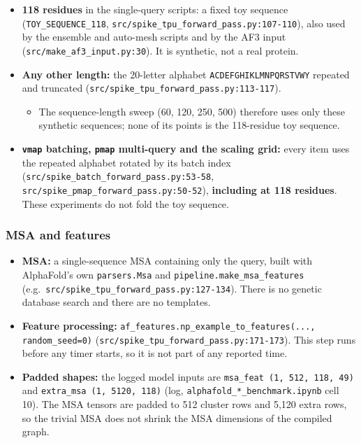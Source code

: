 \begin{itemize}
  \item \textbf{118 residues} in the single-query scripts: a fixed toy sequence
    (\texttt{TOY\_SEQUENCE\_118}, \texttt{src/\allowbreak{}spike\_\allowbreak{}tpu\_\allowbreak{}forward\_\allowbreak{}pass.py:107-110}), also used by the
    ensemble and auto-mesh scripts and by the AF3 input (\texttt{src/\allowbreak{}make\_\allowbreak{}af3\_\allowbreak{}input.py:30}).
    It is synthetic, not a real protein.
  \item \textbf{Any other length:} the 20-letter alphabet \texttt{ACDEFGHIKLMNPQRSTVWY} repeated
    and truncated (\texttt{src/\allowbreak{}spike\_\allowbreak{}tpu\_\allowbreak{}forward\_\allowbreak{}pass.py:113-117}).
    \begin{itemize}
      \item The sequence-length sweep (60, 120, 250, 500) therefore uses only these
        synthetic sequences; none of its points is the 118-residue toy sequence.
    \end{itemize}
  \item \textbf{\texttt{vmap} batching, \texttt{pmap} multi-query and the scaling grid:} every item uses
    the repeated alphabet rotated by its batch index
    (\texttt{src/\allowbreak{}spike\_\allowbreak{}batch\_\allowbreak{}forward\_\allowbreak{}pass.py:53-58}, \texttt{src/\allowbreak{}spike\_\allowbreak{}pmap\_\allowbreak{}forward\_\allowbreak{}pass.py:50-52}),
    \textbf{including at 118 residues}. These experiments do not fold the toy sequence.
\end{itemize}

\subsubsection{MSA and features}
\label{sec:meth-msa}

\begin{itemize}
  \item \textbf{MSA:} a single-sequence MSA containing only the query, built with
    AlphaFold's own \texttt{parsers.Msa} and \texttt{pipeline.make\_\allowbreak{}msa\_\allowbreak{}features} (e.g.\
    \texttt{src/\allowbreak{}spike\_\allowbreak{}tpu\_\allowbreak{}forward\_\allowbreak{}pass.py:127-134}). There is no genetic database search
    and there are no templates.
  \item \textbf{Feature processing:} \texttt{af\_\allowbreak{}features.np\_\allowbreak{}example\_\allowbreak{}to\_\allowbreak{}features(..., random\_\allowbreak{}seed=0)}
    (\texttt{src/\allowbreak{}spike\_\allowbreak{}tpu\_\allowbreak{}forward\_\allowbreak{}pass.py:171-173}). This step runs before any timer
    starts, so it is not part of any reported time.
  \item \textbf{Padded shapes:} the logged model inputs are \texttt{msa\_\allowbreak{}feat (1, 512, 118, 49)} and
    \texttt{extra\_\allowbreak{}msa (1, 5120, 118)} (log, \texttt{alphafold\_\allowbreak{}*\_\allowbreak{}benchmark.ipynb} cell 10). The
    MSA tensors are padded to 512 cluster rows and 5,120 extra rows, so the trivial
    MSA does not shrink the MSA dimensions of the compiled graph.
\end{itemize}

